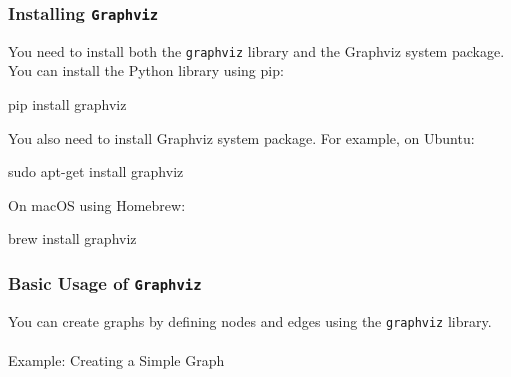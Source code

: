 \documentclass[
  letterpaper,
  DIV=11,
  numbers=noendperiod]{scrreprt}
\makeatletter
\let\oldparagraph\paragraph
\renewcommand{\paragraph}{
    \@ifstar
      \xxxParagraphStar
      \xxxParagraphNoStar
  }
\newcommand{\xxxParagraphStar}[1]{\oldparagraph*{#1}\mbox{}}
\newcommand{\xxxParagraphNoStar}[1]{\oldparagraph{#1}\mbox{}}
\newenvironment{Shaded}{\begin{snugshade}}{\end{snugshade}}
\newcommand{\ExtensionTok}[1]{\textcolor[rgb]{0.00,0.23,0.31}{#1}}
\newcommand{\FunctionTok}[1]{\textcolor[rgb]{0.28,0.35,0.67}{#1}}
\newcommand{\NormalTok}[1]{\textcolor[rgb]{0.00,0.23,0.31}{#1}}
\makeatother
\begin{document}
\subsubsection{\texorpdfstring{Installing
\texttt{Graphviz}}{Installing Graphviz}}\label{installing-graphviz}

You need to install both the \texttt{graphviz} library and the Graphviz
system package. You can install the Python library using pip:

\begin{Shaded}
\begin{Highlighting}[]
\ExtensionTok{pip}\NormalTok{ install graphviz}
\end{Highlighting}
\end{Shaded}

You also need to install Graphviz system package. For example, on
Ubuntu:

\begin{Shaded}
\begin{Highlighting}[]
\FunctionTok{sudo}\NormalTok{ apt{-}get install graphviz}
\end{Highlighting}
\end{Shaded}

On macOS using Homebrew:

\begin{Shaded}
\begin{Highlighting}[]
\ExtensionTok{brew}\NormalTok{ install graphviz}
\end{Highlighting}
\end{Shaded}

\subsubsection{\texorpdfstring{Basic Usage of
\texttt{Graphviz}}{Basic Usage of Graphviz}}\label{basic-usage-of-graphviz}

You can create graphs by defining nodes and edges using the
\texttt{graphviz} library.

\paragraph{Example: Creating a Simple
Graph}\label{example-creating-a-simple-graph}
\end{document}
